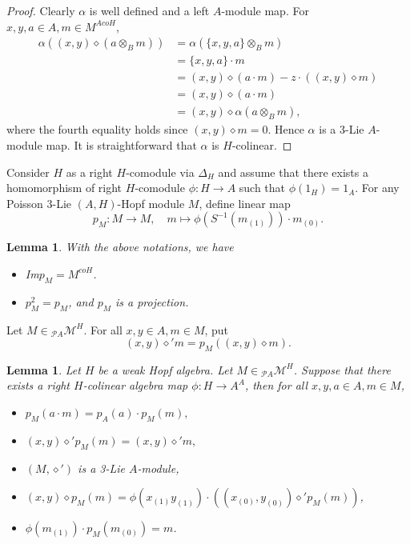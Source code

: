 \documentclass[11pt]{article}
\newtheorem{lemma}[theorem]{Lemma}
\def\di{\diamond}
\def\ot{\otimes}
\begin{document}
\begin{proof}
Clearly $\alpha$ is well defined and a left $A$-module map. For $x,y,a\in A,m\in M^{AcoH}$,
\begin{align*}
\alpha((x,y)\di(a\ot_Bm))&=\alpha(\{x,y,a\}\ot_Bm)\\
&=\{x,y,a\}\cdot m\\
&=(x,y)\di(a\cdot m)-z\cdot((x,y)\di m)\\
&=(x,y)\di(a\cdot m)\\
&=(x,y)\di\alpha(a\ot_Bm),
\end{align*}
where the fourth equality holds since $(x,y)\di m=0$. Hence $\alpha$ is a 3-Lie $A$-module map. It is straightforward that $\alpha$ is $H$-colinear.
\end{proof}


Consider $H$ as a right $H$-comodule via $\Delta_H$ and assume that there exists a homomorphism of right $H$-comodule $\phi:H\rightarrow A$ such that $\phi(1_H)=1_A$. For any Poisson 3-Lie $(A,H)$-Hopf module $M$, define linear map
$$p_M:M\rightarrow M,\quad m\mapsto\phi(S^{-1}(m_{(1)}))\cdot m_{(0)}.$$

\begin{lemma}\cite{Gu}
With the above notations, we have
\begin{itemize}
  \item [(1)] Im$p_M=M^{coH}$.
  \item [(2)] $p^2_M=p_M$, and $p_M$ is a projection.
\end{itemize}
\end{lemma}

Let $M\in\! _{\mathcal{P}A}\mathcal{M}^H$. For all $x,y\in A,m\in M$, put
$$(x,y)\di' m=p_M((x,y)\di m).$$

\begin{lemma}\label{lem:3d}
Let $H$ be a weak Hopf algebra. Let $M\in\! _{\mathcal{P}A}\mathcal{M}^H$. Suppose that there exists a right $H$-colinear algebra map $\phi:H\rightarrow A^A$, then for all $x,y,a\in A,m\in M$,
\begin{itemize}
  \item [(1)] $p_M(a\cdot m)=p_A(a)\cdot p_M(m),$
  \item [(2)] $(x,y)\di'p_M(m)=(x,y)\di' m,$
  \item [(3)] $(M,\di')$ is a 3-Lie $A$-module,
  \item [(4)] $(x,y)\di p_M(m)=\phi(x_{(1)}y_{(1)})\cdot ((x_{(0)},y_{(0)})\di'p_M(m))$,
  \item [(5)] $\phi(m_{(1)})\cdot p_M(m_{(0)})=m$.
\end{itemize}
\end{lemma}
\end{document}

